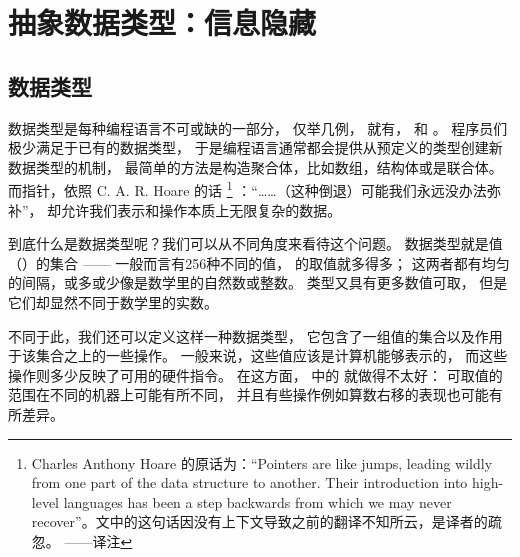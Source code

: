 

\chapter{抽象数据类型：信息隐藏}
\label{ch:AbstractDateTypes}

\section{数据类型}

数据类型是每种编程语言不可或缺的一部分，
仅举几例， 就有， 和 。
程序员们极少满足于已有的数据类型，
于是编程语言通常都会提供从预定义的类型创建新数据类型的机制，
最简单的方法是构造聚合体，比如数组，结构体或是联合体。
而指针，依照 C. A. R. Hoare 的话
\footnote{
Charles Anthony Hoare 的原话为：``Pointers are like jumps, leading wildly
from one part of the data structure to another. Their introduction into
high-level languages has been a step backwards from which we may never
recover''。文中的这句话因没有上下文导致之前的翻译不知所云，是译者的疏忽。
\hfill ——译注
}%
：“……（这种倒退）可能我们永远没办法弥补”，
却允许我们表示和操作本质上无限复杂的数据。

到底什么是数据类型呢？我们可以从不同角度来看待这个问题。
数据类型就是值（）的集合
—— 一般而言有256种不同的值，
 的取值就多得多；
这两者都有均匀的间隔，或多或少像是数学里的自然数或整数。
 类型又具有更多数值可取，
但是它们却显然不同于数学里的实数。

不同于此，我们还可以定义这样一种数据类型，
它包含了一组值的集合以及作用于该集合之上的一些操作。
一般来说，这些值应该是计算机能够表示的，
而这些操作则多少反映了可用的硬件指令。
在这方面， 中的  就做得不太好：
可取值的范围在不同的机器上可能有所不同，
并且有些操作例如算数右移的表现也可能有所差异。

